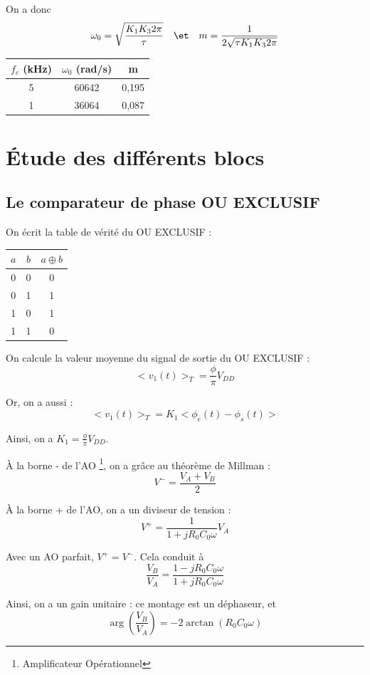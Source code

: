 \documentclass[../../Cours_M1.tex]{subfiles}
\begin{document}
On a donc
\[ \omega_0 = \sqrt{\frac{K_1K_3 2\pi}{\tau}}  \quad \et \quad
m = \frac{1}{2\sqrt{\tau K_1 K_3 2 \pi}} \]

\begin{center}
\begin{tabular}{|c|c|c|}
\hline
$f_c$ (kHz) & $\omega_0$ (rad/s) & m \\
\hline
5 & 60642 & 0,195 \\
\hline
1 & 36064 & 0,087 \\
\hline
\end{tabular}
\end{center}

\section{Étude des différents blocs}

\subsection{Le comparateur de phase OU EXCLUSIF}

On écrit la table de vérité du OU EXCLUSIF :
\begin{center}
\begin{tabular}{|c|c|c|}
\hline
$a$ & $b$ & $a\oplus b$ \\
\hline
0 & 0 & 0 \\
\hline
0 & 1 & 1 \\
\hline
1 & 0 & 1 \\
\hline
1 & 1 & 0 \\
\hline
\end{tabular}
\end{center}

On calcule la valeur moyenne du signal de sortie du OU EXCLUSIF :
\[<v_1(t)>_T = \frac{\phi}{\pi} V_{DD}\]

Or, on a aussi :
\[<v_1(t)>_T = K_1 <\phi_e(t)-\phi_s(t)>\]

Ainsi, on a $K_1 = \frac{\phi}{\pi}V_{DD}$.

À la borne - de l'AO \footnote{Amplificateur Opérationnel}, on a grâce au théorème de Millman :
\[ V^-=\frac{V_A+V_B}{2} \]

À la borne + de l'AO, on a un diviseur de tension :
\[ V^+=\frac{1}{1+jR_0C_0\omega}V_A\]

Avec un AO parfait, $V^+ = V^-$. Cela conduit à
\[ \frac{V_B}{V_A} = \frac{1-jR_0C_0\omega}{1+jR_0C_0\omega} \]

Ainsi, on a un gain unitaire : ce montage est un déphaseur, et
\[ \arg(\frac{V_B}{V_A}) = -2\arctan(R_0C_0\omega) \]
\end{document}
